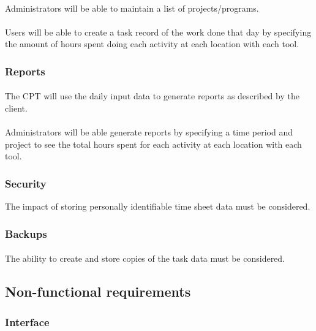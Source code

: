 \documentclass[12pt]{article}
\begin{document}
\paragraph{} Administrators will be able to maintain a list of projects/programs.
\paragraph{} Users will be able to create a task record of the work done that day by specifying the amount of hours spent doing each activity at each location with each tool.


\subsubsection{Reports}\label{sec:Reports}
\paragraph{} The CPT will use the daily input data to generate reports as described by the client.
\paragraph{} Administrators will be able generate reports by specifying a time period and project to see the total hours spent for each activity at each location with each tool.

\subsubsection{Security}\label{sec:Security}
The impact of storing personally identifiable time sheet data must be considered.

\subsubsection{Backups}\label{sec:Backups}
\paragraph{} The ability to create and store copies of the task data must be considered.

\subsection{Non-functional requirements}
\subsubsection{Interface}\label{sec:Interface}
\end{document}
